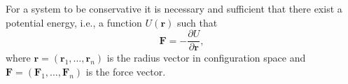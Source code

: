 For a system to be conservative it is necessary and sufficient that there exist a potential energy, i.e., a function $U(\mathbf{r})$ such that
$$\mathbf{F} = -\frac{\partial U}{\partial \mathbf{r}},$$
where $\mathbf{r} = (\mathbf{r}_1, \ldots, \mathbf{r}_n)$ is the radius vector in configuration space and $\mathbf{F} = (\mathbf{F}_1, \ldots, \mathbf{F}_n)$ is the force vector.

